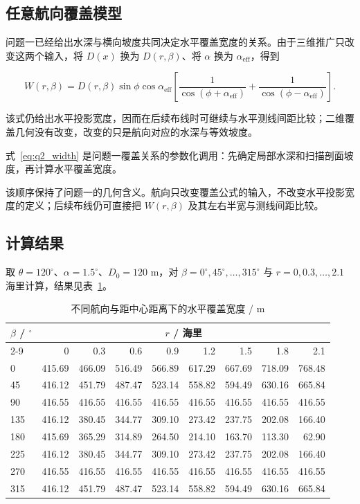 \subsection{任意航向覆盖模型}

问题一已经给出水深与横向坡度共同决定水平覆盖宽度的关系。由于三维推广只改变这两个输入，将 $D(x)$ 换为 $D(r,\beta)$、将 $\alpha$ 换为 $\alpha_{\mathrm{eff}}$，得到

\begin{equation}
  W(r,\beta)=D(r,\beta)\sin\phi\cos\alpha_{\mathrm{eff}}
  \left[\frac{1}{\cos(\phi+\alpha_{\mathrm{eff}})}+\frac{1}{\cos(\phi-\alpha_{\mathrm{eff}})}\right].
  \label{eq:q2_width}
\end{equation}

该式仍给出水平投影宽度，因而在后续布线时可继续与水平测线间距比较；二维覆盖几何没有改变，改变的只是航向对应的水深与等效坡度。

式~\eqref{eq:q2_width} 是问题一覆盖关系的参数化调用：先确定局部水深和扫描剖面坡度，再计算水平覆盖宽度。

该顺序保持了问题一的几何含义。航向只改变覆盖公式的输入，不改变水平投影宽度的定义；后续布线仍可直接把 $W(r,\beta)$ 及其左右半宽与测线间距比较。

\subsection{计算结果}

取 $\theta=120^\circ$、$\alpha=1.5^\circ$、$D_0=120\text{ m}$，对 $\beta=0^\circ,45^\circ,\ldots,315^\circ$ 与 $r=0,0.3,\ldots,2.1$ 海里计算，结果见表~\ref{tab:q2}。

\begin{table}[H]
  \centering
  \caption{不同航向与距中心距离下的水平覆盖宽度 / m}
  \label{tab:q2}
  \begin{tabular}{lrrrrrrrr}
    \toprule
    $\beta$ / $^\circ$ & \multicolumn{8}{c}{$r$ / 海里} \\
    \cmidrule(lr){2-9}
     & 0 & 0.3 & 0.6 & 0.9 & 1.2 & 1.5 & 1.8 & 2.1 \\
    \midrule
    0   & 415.69 & 466.09 & 516.49 & 566.89 & 617.29 & 667.69 & 718.09 & 768.48 \\
    45  & 416.12 & 451.79 & 487.47 & 523.14 & 558.82 & 594.49 & 630.16 & 665.84 \\
    90  & 416.55 & 416.55 & 416.55 & 416.55 & 416.55 & 416.55 & 416.55 & 416.55 \\
    135 & 416.12 & 380.45 & 344.77 & 309.10 & 273.42 & 237.75 & 202.08 & 166.40 \\
    180 & 415.69 & 365.29 & 314.89 & 264.50 & 214.10 & 163.70 & 113.30 & 62.90  \\
    225 & 416.12 & 380.45 & 344.77 & 309.10 & 273.42 & 237.75 & 202.08 & 166.40 \\
    270 & 416.55 & 416.55 & 416.55 & 416.55 & 416.55 & 416.55 & 416.55 & 416.55 \\
    315 & 416.12 & 451.79 & 487.47 & 523.14 & 558.82 & 594.49 & 630.16 & 665.84 \\
    \bottomrule
  \end{tabular}
\end{table}

